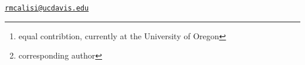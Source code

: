 \address{%
Suzanne H. Austin \footnote{equal contribtion, currently at the
  University of Oregon}\\
University of California, Davis\\
\\
}


\address{%
Andrew S. Lang\\
University of New Hampshire\\
\\
}


\address{%
Victoria S. Farrar\\
University of California, Davis\\
\\
}


\address{%
April Booth\\
University of California, Davis\\
\\
}


\address{%
Tanner Feustel\\
University of California, Davis\\
\\
}


\address{%
Matthew D. MacManes\\
University of New Hampshire\\
\\
}


\address{%
Rebecca M. Calisi \footnote{corresponding author}\\
University of California, Davis\\
\\
}
\href{mailto:rmcalisi@ucdavis.edu}{\nolinkurl{rmcalisi@ucdavis.edu}}

